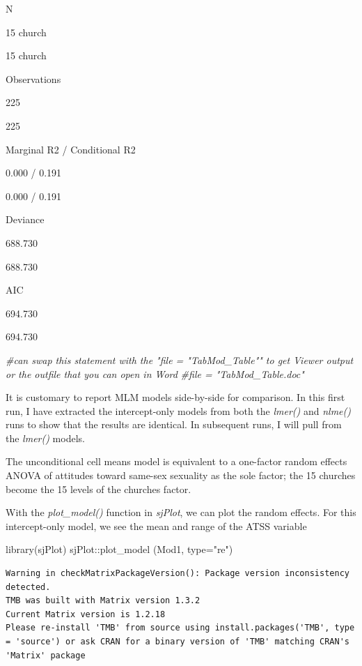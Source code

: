 \documentclass[
  english,
]{book}
\newenvironment{Shaded}{\begin{snugshade}}{\end{snugshade}}
\newcommand{\AttributeTok}[1]{\textcolor[rgb]{0.77,0.63,0.00}{#1}}
\newcommand{\CommentTok}[1]{\textcolor[rgb]{0.56,0.35,0.01}{\textit{#1}}}
\newcommand{\FunctionTok}[1]{\textcolor[rgb]{0.00,0.00,0.00}{#1}}
\newcommand{\NormalTok}[1]{#1}
\newcommand{\SpecialCharTok}[1]{\textcolor[rgb]{0.00,0.00,0.00}{#1}}
\newcommand{\StringTok}[1]{\textcolor[rgb]{0.31,0.60,0.02}{#1}}
\begin{document}
N

15 church

15 church

Observations

225

225

Marginal R2 / Conditional R2

0.000 / 0.191

0.000 / 0.191

Deviance

688.730

688.730

AIC

694.730

694.730

\begin{Shaded}
\begin{Highlighting}[]
\CommentTok{\#can swap this statement with the "file = "TabMod\_Table"" to get Viewer output or the outfile that you can open in Word}
\CommentTok{\#file = "TabMod\_Table.doc"}
\end{Highlighting}
\end{Shaded}

It is customary to report MLM models side-by-side for comparison. In this first run, I have extracted the intercept-only models from both the \emph{lmer()} and \emph{nlme()} runs to show that the results are identical. In subsequent runs, I will pull from the \emph{lmer()} models.

The unconditional cell means model is equivalent to a one-factor random effects ANOVA of attitudes toward same-sex sexuality as the sole factor; the 15 churches become the 15 levels of the churches factor.

With the \emph{plot\_model()} function in \emph{sjPlot}, we can plot the random effects. For this intercept-only model, we see the mean and range of the ATSS variable

\begin{Shaded}
\begin{Highlighting}[]
\FunctionTok{library}\NormalTok{(sjPlot)}
\NormalTok{sjPlot}\SpecialCharTok{::}\FunctionTok{plot\_model}\NormalTok{ (Mod1, }\AttributeTok{type=}\StringTok{"re"}\NormalTok{)}
\end{Highlighting}
\end{Shaded}

\begin{verbatim}
Warning in checkMatrixPackageVersion(): Package version inconsistency detected.
TMB was built with Matrix version 1.3.2
Current Matrix version is 1.2.18
Please re-install 'TMB' from source using install.packages('TMB', type = 'source') or ask CRAN for a binary version of 'TMB' matching CRAN's 'Matrix' package
\end{verbatim}
\end{document}
